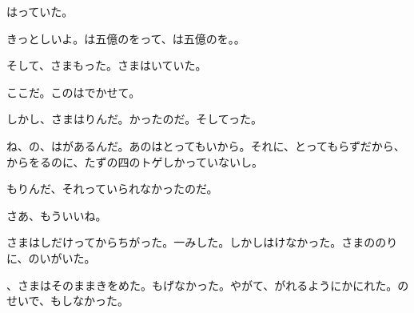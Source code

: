 はっていた。

きっとしいよ。は五億のをって、は五億のを。。

そして、さまもった。さまはいていた。

ここだ。このはでかせて。

しかし、さまはりんだ。かったのだ。そしてった。

ね、の、はがあるんだ。あのはとってもいから。それに、とってもらずだから、からをるのに、たずの四のトゲしかっていないし。

もりんだ、それっていられなかったのだ。

さあ、もういいね。

さまはしだけってからちがった。一みした。しかしはけなかった。さまののりに、のいがいた。

、さまはそのままきをめた。もげなかった。やがて、がれるようにかにれた。のせいで、もしなかった。


